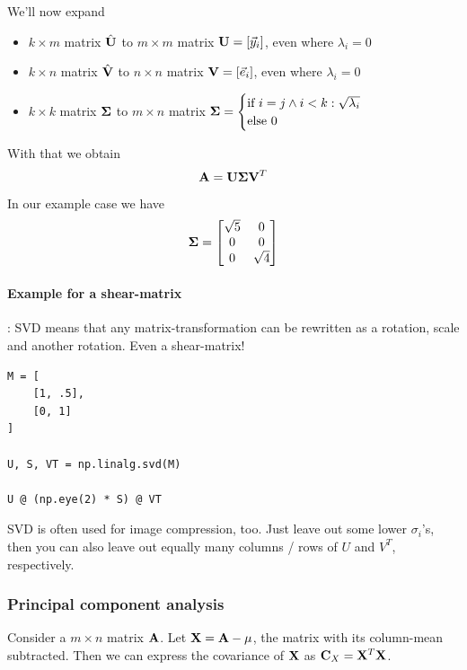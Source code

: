We'll now expand
\begin{itemize}
    \item $k \times m$ matrix $\hat{\mathbf{U}}$ to $m \times m$ matrix $\mathbf{U} = [\vec{y}_i]$, even where $\lambda_i = 0$
    \item $k \times n$ matrix $\hat{\mathbf{V}}$ to $n \times n$ matrix $\mathbf{V} = [\vec{e}_i]$, even where $\lambda_i = 0$
    \item $k \times k$ matrix $\mathbf{\Sigma}$ to $m \times n$ matrix $\mathbf{\Sigma} = \begin{cases}
        \text{if } i = j \land i < k: \sqrt{\lambda_i} \\
        \text{else } 0
    \end{cases}$
\end{itemize}
With that we obtain
\begin{equation}
    \mathbf{A} = \mathbf{U} \mathbf{\Sigma} \mathbf{V}^T
\end{equation}
In our example case we have 
$$
    \mathbf{\Sigma} = \begin{bmatrix}
        \sqrt{5} & 0 \\
        0        & 0 \\
        0        & \sqrt{4}
    \end{bmatrix}
$$




\paragraph{Example for a shear-matrix}: SVD means that any matrix-transformation can be rewritten as a rotation, scale and another rotation. Even a shear-matrix!
\begin{lstlisting}
M = [
    [1, .5],
    [0, 1]
]

U, S, VT = np.linalg.svd(M)

U @ (np.eye(2) * S) @ VT
\end{lstlisting}
SVD is often used for image compression, too. Just leave out some lower $\sigma_i$'s, then you can also leave out equally many columns / rows of $U$ and $V^T$, respectively.


\subsubsection{Principal component analysis}
Consider a $m \times n$ matrix $\mathbf{A}$. Let $\mathbf{X} = \mathbf{A} - \mathbf{\mu}$, the matrix with its column-mean subtracted.
Then we can express the covariance of $\mathbf{X}$ as $\mathbf{C}_X = \mathbf{X}^T \mathbf{X}$.

